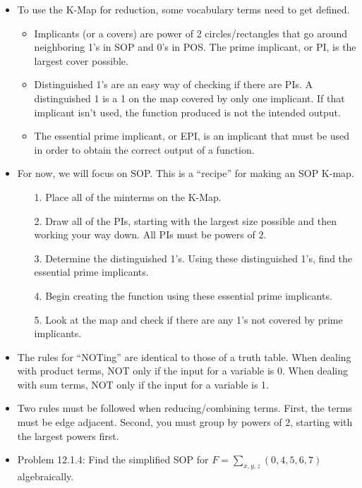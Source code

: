 \documentclass[10pt,a4paper]{article}
\begin{document}
\begin{itemize}
\item To use the K-Map for reduction, some vocabulary terms need to get defined.
\begin{itemize}
\item Implicants (or a covers) are power of 2 circles/rectangles that go around neighboring 1's in SOP and 0's in POS. The prime implicant, or PI, is the largest cover possible. 
\item Distinguished 1's are an easy way of checking if there are PIs. A distinguished 1 is a 1 on the map covered by only one implicant. If that implicant isn't used, the function produced is not the intended output. 
\item The essential prime implicant, or EPI, is an implicant that must be used in order to obtain the correct output of a function. 
\end{itemize}
\item For now, we will focus on SOP. This is a ``recipe'' for making an SOP K-map.
\begin{enumerate}
\item [1.] Place all of the minterms on the K-Map.
\item [2.] Draw all of the PIs, starting with the largest size possible and then working your way down. All PIs must be powers of 2. 
\item [3.] Determine the distinguished 1's. Using these distinguished 1's, find the essential prime implicants. 
\item [4.] Begin creating the function using these essential prime implicants.
\item [5.] Look at the map and check if there are any 1's not covered by prime implicants. 
\end{enumerate}
\item The rules for ``NOTing'' are identical to those of a truth table. When dealing with product terms, NOT only if the input for a variable is 0. When dealing with sum terms, NOT only if the input for a variable is 1. 
\item Two rules must be followed when reducing/combining terms. First, the terms must be edge adjacent. Second, you must group by powers of 2, starting with the largest powers first.
\item Problem 12.1.4: Find the simplified SOP for $F=\sum_{x,y,z}(0,4,5,6,7)$ algebraically.\\

\end{itemize}
\end{document}
